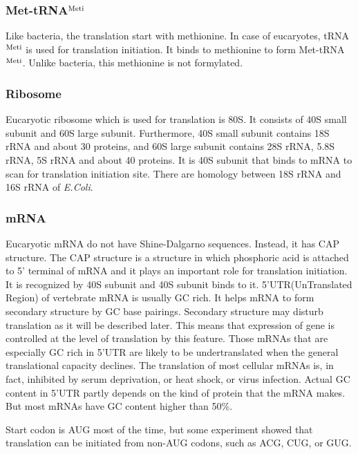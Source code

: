 \subsubsection{Met-tRNA$^{\rm Meti}$}
Like bacteria, the translation start with methionine.
In case of eucaryotes, tRNA$^{\rm Meti}$ is used for translation initiation.
It binds to methionine to form Met-tRNA$^{\rm Meti}$. Unlike bacteria,
this methionine is not formylated.

\subsubsection{Ribosome}
Eucaryotic ribosome which is used for translation is 80S. It consists
of 40S small subunit and 60S large subunit. Furthermore,
40S small subunit contains 18S rRNA and about 30 proteins,
and 60S large subunit contains 28S rRNA, 5.8S rRNA, 5S rRNA and
about 40 proteins. It is 40S subunit that binds to mRNA to scan for
translation initiation site. There are homology between 18S rRNA and
16S rRNA of {\it E.Coli}.

\subsubsection{mRNA}
Eucaryotic mRNA do not have Shine-Dalgarno sequences. Instead,
it has CAP structure. The CAP structure is a structure in
which phosphoric acid is attached to 5' terminal of mRNA
and it plays an important role for translation initiation. 
It is recognized by 40S subunit and 40S subunit binds to it.
5'UTR(UnTranslated Region) of vertebrate mRNA is usually GC rich.
It helps mRNA to form secondary structure by GC base pairings.
Secondary structure may disturb translation as it will be
described later. This means that expression of gene is controlled 
at the level of translation by this feature. Those mRNAs that are 
especially GC rich in 5'UTR are likely to be undertranslated when the general 
translational capacity declines. The translation of most cellular 
mRNAs is, in fact, inhibited by serum deprivation, or heat shock, or
virus infection. Actual GC content in 5'UTR partly depends on the kind of
protein that the mRNA makes. But most mRNAs have GC content higher
than 50\%. 

Start codon is AUG most of the time, but some experiment showed
that translation can be initiated from non-AUG codons, such as
ACG, CUG, or GUG\cite{label6}\cite{label29}.


